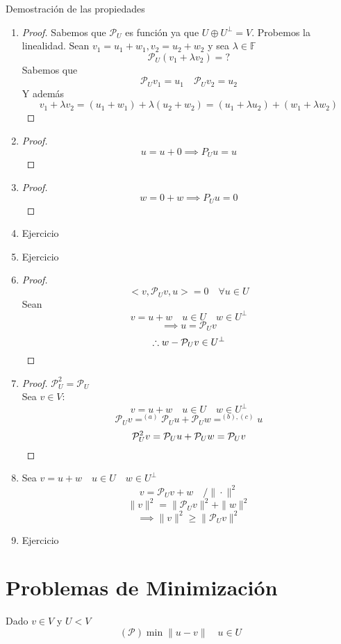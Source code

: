 \documentclass[11pt]{book}
\newcommand{\set}[1]{\mathbb{#1}}
\theoremstyle{definition}
\begin{document}
Demostración de las propiedades
\begin{enumerate}[label=\textbf{(\alph*)}]
	\item \begin{proof}
		Sabemos que $\mathcal{P}_U$ es función ya que $U\oplus U^\perp=V$. Probemos la linealidad. Sean $v_1=u_1+w_1,v_2=u_2+w_2$ y sea $\lambda\in\set{F}$
		\[\mathcal{P}_U(v_1+\lambda v_2)=?\]
		Sabemos que
		\[\mathcal{P}_Uv_1=u_1\quad\mathcal{P}_Uv_2=u_2\]
		Y además
		\[v_1+\lambda v_2=(u_1+w_1)+\lambda (u_2+w_2)=(u_1+\lambda u_2)+(w_1+\lambda w_2)\]
	\end{proof}

	\item \begin{proof}
		\[u=u+0\implies P_Uu=u\]
	\end{proof}
	
	\item \begin{proof}
		\[w=0+w\implies P_Uu=0\]
	\end{proof}

	\item Ejercicio

	\item Ejercicio

	\item \begin{proof}
		\[<v,\mathcal{P}_Uv,u>=0\quad\forall u\in U\]
		Sean
		\[v=u+w\quad u\in U\quad w\in U^\perp\]
		\[\implies u=\mathcal{P}_Uv\]
		\[\therefore w-\mathcal{P}_Uv\in U^\perp\qedhere\]
	\end{proof}

	\item \begin{proof}
		$\mathcal{P}_U^2=\mathcal{P}_U$\\
		Sea $v\in V$:
		\[v=u+w\quad u \in U\quad w\in U^\perp\]
		\[\mathcal{P}_Uv=^{(a)}\mathcal{P}_Uu+\mathcal{P}_Uw=^{(b),(c)}u\]
		\[\mathcal{P}_U^2v=\mathcal{P}_Uu+\mathcal{P}_Uw=\mathcal{P}_Uv\qedhere\]
	\end{proof}

	\item Sea $v=u+w\quad u\in U\quad w\in U^\perp$
	\[v=\mathcal{P}_Uv+w\quad/\|\cdot\|^2\]
	\[\|v\|^2=\|\mathcal{P}_Uv\|^2+\|w\|^2\]
	\[\implies \|v\|^2\geq \|\mathcal{P}_Uv\|^2\]

	\item Ejercicio
\end{enumerate}
\section{Problemas de Minimización}
Dado $v\in V$ y $U<V$
\[(\mathcal{P})\min \|u-v\|\quad u\in U\]
\end{document}
